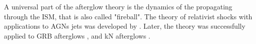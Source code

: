 %
%
%
%
%
%
%
%
%
%
%

A universal part of the afterglow theory is the dynamics of the \trans{} 
\blast{} propagating through the \ac{ISM}, that is also called "fireball".
%
The theory of relativist shocks with applications to \acp{AGN} jets was 
developed by \citet{Blandford:1976}. Later, the theory was successfully 
applied to \ac{GRB} afterglows \citep{Costa:1997cg,vanParadijs:1997wr,Frail:1997qf},
and \ac{kN} afterglows \citep[\eg][]{Nakar:2011cw,Hotokezaka:2015eja,Hotokezaka:2018gmo}.

